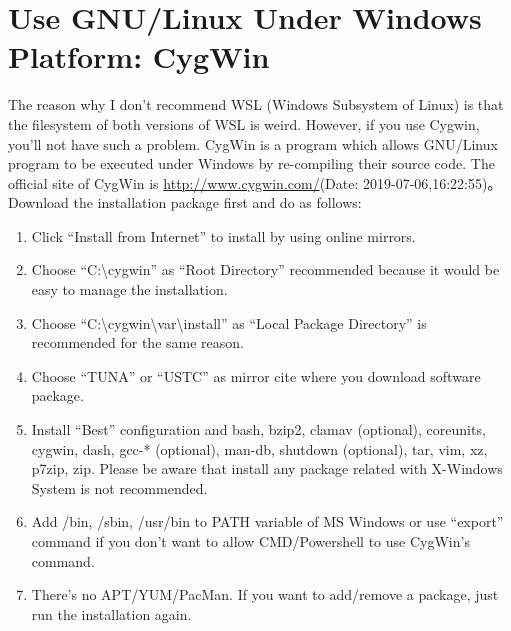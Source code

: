 \section{Use GNU/Linux Under Windows Platform: CygWin}
The reason why I don't recommend WSL (Windows Subsystem of Linux) is that the filesystem of both versions of WSL is weird. However, if you use Cygwin, you'll not have such a problem. CygWin is a program which allows GNU/Linux program to be executed under Windows by re-compiling their source code. The official site of CygWin is \url{http://www.cygwin.com/}(Date: 2019-07-06,16:22:55)。Download the installation package first and do as follows:
\begin{enumerate}
\item Click ``Install from Internet'' to install by using online mirrors.
\item Choose ``C:\textbackslash cygwin'' as ``Root  Directory'' recommended because it would be easy to manage the installation.
\item Choose  ``C:\textbackslash cygwin\textbackslash var\textbackslash install'' as ``Local Package Directory'' is recommended for the same reason.
\item Choose ``TUNA'' or ``USTC'' as mirror cite where you download software package.
\item Install ``Best'' configuration and bash, bzip2, clamav (optional), coreunits, cygwin, dash, gcc-* (optional), man-db, shutdown (optional), tar, vim, xz, p7zip, zip. Please be aware that install any package related with X-Windows System is not recommended.
\item Add /bin, /sbin, /usr/bin to PATH variable of MS Windows or use ``export'' command if you don't want to allow CMD/Powershell to use CygWin's command.
\item There's no APT/YUM/PacMan. If you want to add/remove a package, just run the installation again.
\end{enumerate}

